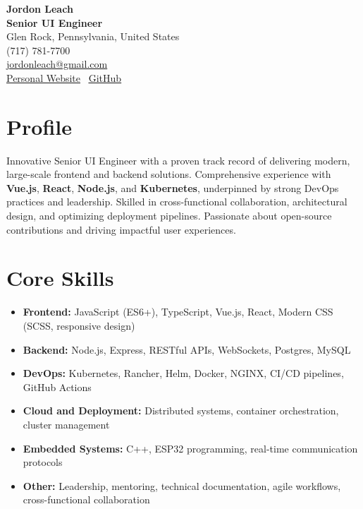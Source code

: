 \documentclass[a4paper,10pt]{article}
\begin{document}
\begin{center}
    \textbf{\Huge Jordon Leach} \\
    \vspace{2mm}
    \textbf{Senior UI Engineer} \\
    \vspace{2mm}
    Glen Rock, Pennsylvania, United States \\
    (717) 781-7700 \\
    \href{mailto:jordonleach@gmail.com}{jordonleach@gmail.com} \\
    \href{https://jordonleach.dev}{\underline{Personal Website}} \textbar\ 
    \href{https://github.com/jordojordo}{\underline{GitHub}}
\end{center}

\vspace{5mm}

\section*{Profile}
Innovative Senior UI Engineer with a proven track record of delivering modern, large-scale frontend and backend solutions. Comprehensive experience with \textbf{Vue.js}, \textbf{React}, \textbf{Node.js}, and \textbf{Kubernetes}, underpinned by strong DevOps practices and leadership. Skilled in cross-functional collaboration, architectural design, and optimizing deployment pipelines. Passionate about open-source contributions and driving impactful user experiences.

\section*{Core Skills}
\begin{itemize}[leftmargin=1.5em]
    \item \textbf{Frontend:} JavaScript (ES6+), TypeScript, Vue.js, React, Modern CSS (SCSS, responsive design)
    \item \textbf{Backend:} Node.js, Express, RESTful APIs, WebSockets, Postgres, MySQL
    \item \textbf{DevOps:} Kubernetes, Rancher, Helm, Docker, NGINX, CI/CD pipelines, GitHub Actions
    \item \textbf{Cloud and Deployment:} Distributed systems, container orchestration, cluster management
    \item \textbf{Embedded Systems:} C++, ESP32 programming, real-time communication protocols
    \item \textbf{Other:} Leadership, mentoring, technical documentation, agile workflows, cross-functional collaboration
\end{itemize}
\end{document}
